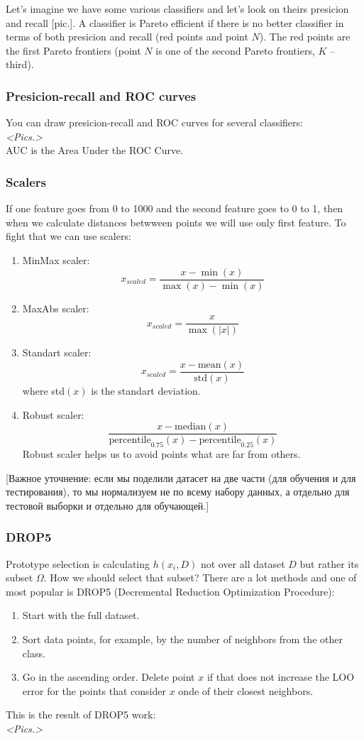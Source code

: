 Let's imagine we have some various classifiers and let's look on theirs presicion and recall [pic.]. A classifier is Pareto efficient if there is no better classifier in terms of both presicion and recall (red points and point $N$). The red points are the first Pareto frontiers (point $N$ is one of the second Pareto frontiers, $K$ -- third).

\subsubsection*{Presicion-recall and ROC curves}

You can draw presicion-recall and ROC curves for several classifiers:\\
{\it <Pics.>} \\
AUC is the Area Under the ROC Curve.

\subsubsection*{Scalers}

If one feature goes from 0 to 1000 and the second feature goes to 0 to 1, then when we calculate distances betwween points we will use only first feature. To fight that we can use scalers:
\begin{enumerate}[label=$\bullet$]
	\item MinMax scaler: $$x_{scaled}=\frac{x-\min(x)}{\max(x)-\min(x)}$$
	\item MaxAbs scaler: $$x_{scaled}=\frac{x}{\max(|x|)}$$
	\item Standart scaler: $$x_{scaled}=\frac{x-\text{mean}(x)}{\text{std}(x)}$$ where std$(x)$ is the standart deviation.
	\item Robust scaler: $$\frac{x-\text{median}(x)}{\text{percentile}_{0.75}(x)-\text{percentile}_{0.25}(x)}$$
	Robust scaler helps us to avoid points what are far from others.
\end{enumerate}
[Важное уточнение: если мы поделили датасет на две части (для обучения и для тестирования), то мы нормализуем не по всему набору данных, а отдельно для тестовой выборки и отдельно для обучающей.]

\subsubsection*{DROP5}

Prototype selection is calculating $h(x_i, D)$ not over all dataset $D$ but rather its subset $\Omega$. How we should select that subset? There are a lot methods and one of most popular is DROP5 (Decremental Reduction Optimization Procedure):
\begin{enumerate}
	\item Start with the full dataset.
	\item Sort data points, for example, by the number of neighbors from the other class.
	\item Go in the ascending order. Delete point $x$ if that does not increase the LOO error for the points that consider $x$ onde of their closest neighbors.
\end{enumerate}
This is the result of DROP5 work:\\
{\it <Pics.>}

